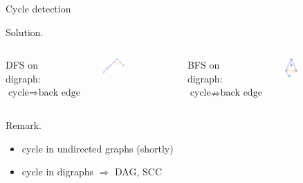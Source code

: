\begin{frame}{Cycle detection}
  \begin{block}{Solution.}
    \begin{columns}[t]
	DFS on digraph: $\text{cycle} \Rightarrow \text{back edge}$
	\begin{figure}
	  \centering
	  \includegraphics[width=0.50\textwidth]{figures/dfs-digraph-cycle-detection-without-back.pdf}
	\end{figure}
	BFS on digraph: $\text{cycle} \nRightarrow \text{back edge}$
	\begin{figure}
	  \centering
	  \includegraphics[width=0.30\textwidth]{figures/bfs-digraph-cycle-without-back.png}
	\end{figure}
      \end{columns}
  \end{block}

  \begin{alertblock}{Remark.}
    \begin{itemize}
      \item cycle in undirected graphs (shortly)
      \item cycle in digraphs $\Rightarrow$ DAG, SCC
    \end{itemize}
  \end{alertblock}
\end{frame}
